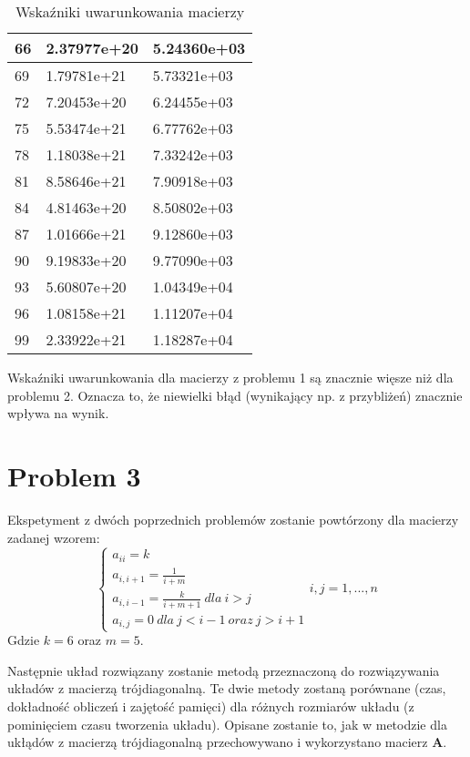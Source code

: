 \documentclass{article}
\begin{document}
\begin{table}[H]
\begin{tabular}{|l|l|l|}
66 & 2.37977e+20 & 5.24360e+03 \\ \hline
69 & 1.79781e+21 & 5.73321e+03 \\ \hline
72 & 7.20453e+20 & 6.24455e+03 \\ \hline
75 & 5.53474e+21 & 6.77762e+03 \\ \hline
78 & 1.18038e+21 & 7.33242e+03 \\ \hline
81 & 8.58646e+21 & 7.90918e+03 \\ \hline
84 & 4.81463e+20 & 8.50802e+03 \\ \hline
87 & 1.01666e+21 & 9.12860e+03 \\ \hline
90 & 9.19833e+20 & 9.77090e+03 \\ \hline
93 & 5.60807e+20 & 1.04349e+04 \\ \hline
96 & 1.08158e+21 & 1.11207e+04 \\ \hline
99 & 2.33922e+21 & 1.18287e+04 \\ \hline
\end{tabular}
\caption{Wskaźniki uwarunkowania macierzy}
\end{table}

Wskaźniki uwarunkowania dla macierzy z problemu 1 są znacznie więsze niż dla problemu 2.
Oznacza to, że niewielki błąd (wynikający np. z przybliżeń) znacznie wpływa na wynik.

\section{Problem 3}
Ekspetyment z dwóch poprzednich problemów zostanie powtórzony dla macierzy zadanej wzorem:
$$
\begin{cases}
    a_{ii}=k\\
    a_{i,i+1}=\frac{1}{i+m}\\
    a_{i,i-1}=\frac{k}{i+m+1} \ dla \ i > j\\
    a_{i,j}=0 \ dla \ j<i-1 \ oraz \ j>i+1
\end{cases}i,j=1,...,n
$$
Gdzie $k=6$ oraz $m=5$.

Następnie układ rozwiązany zostanie metodą przeznaczoną do rozwiązywania układów z macierzą trójdiagonalną. Te dwie metody
zostaną porównane (czas, dokładność obliczeń i zajętość pamięci) dla różnych rozmiarów układu (z pominięciem czasu tworzenia
układu). Opisane zostanie to, jak w metodzie dla ukłądów z macierzą trójdiagonalną przechowywano i wykorzystano macierz \textbf{A}.
\end{document}
